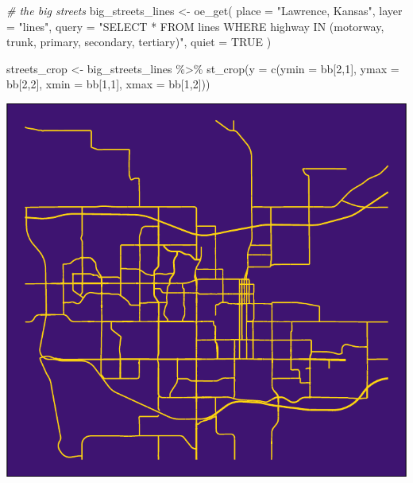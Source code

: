 \documentclass[
  paper=a4,
  ,captions=tableheading
]{scrartcl}
\newenvironment{Shaded}{\begin{snugshade}}{\end{snugshade}}
\newcommand{\AttributeTok}[1]{\textcolor[rgb]{0.77,0.63,0.00}{#1}}
\newcommand{\CommentTok}[1]{\textcolor[rgb]{0.56,0.35,0.01}{\textit{#1}}}
\newcommand{\ConstantTok}[1]{\textcolor[rgb]{0.00,0.00,0.00}{#1}}
\newcommand{\DecValTok}[1]{\textcolor[rgb]{0.00,0.00,0.81}{#1}}
\newcommand{\FunctionTok}[1]{\textcolor[rgb]{0.00,0.00,0.00}{#1}}
\newcommand{\NormalTok}[1]{#1}
\newcommand{\OtherTok}[1]{\textcolor[rgb]{0.56,0.35,0.01}{#1}}
\newcommand{\SpecialCharTok}[1]{\textcolor[rgb]{0.00,0.00,0.00}{#1}}
\newcommand{\StringTok}[1]{\textcolor[rgb]{0.31,0.60,0.02}{#1}}
\begin{document}
\begin{Shaded}
\begin{Highlighting}[]
\CommentTok{\# the big streets}
\NormalTok{big\_streets\_lines }\OtherTok{\textless{}{-}} \FunctionTok{oe\_get}\NormalTok{(}
  \AttributeTok{place =} \StringTok{"Lawrence, Kansas"}\NormalTok{, }
  \AttributeTok{layer =} \StringTok{"lines"}\NormalTok{,}
  \AttributeTok{query =} \StringTok{"SELECT * FROM lines WHERE highway IN (\textquotesingle{}motorway\textquotesingle{}, \textquotesingle{}trunk\textquotesingle{},  \textquotesingle{}primary\textquotesingle{},  \textquotesingle{}secondary\textquotesingle{}, \textquotesingle{}tertiary\textquotesingle{})"}\NormalTok{,}
  \AttributeTok{quiet =} \ConstantTok{TRUE}
\NormalTok{)}

\NormalTok{streets\_crop }\OtherTok{\textless{}{-}}\NormalTok{ big\_streets\_lines }\SpecialCharTok{\%\textgreater{}\%}
  \FunctionTok{st\_crop}\NormalTok{(}\AttributeTok{y =} \FunctionTok{c}\NormalTok{(}\AttributeTok{ymin =}\NormalTok{ bb[}\DecValTok{2}\NormalTok{,}\DecValTok{1}\NormalTok{], }\AttributeTok{ymax =}\NormalTok{ bb[}\DecValTok{2}\NormalTok{,}\DecValTok{2}\NormalTok{], }\AttributeTok{xmin =}\NormalTok{ bb[}\DecValTok{1}\NormalTok{,}\DecValTok{1}\NormalTok{], }\AttributeTok{xmax =}\NormalTok{ bb[}\DecValTok{1}\NormalTok{,}\DecValTok{2}\NormalTok{]))}
\end{Highlighting}
\end{Shaded}

\includegraphics{Haskell_files/figure-latex/unnamed-chunk-19-1.pdf}
\end{document}
